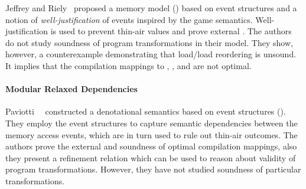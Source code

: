 Jeffrey and Riely~\cite{Jeffrey-Riely:LICS16} proposed 
a memory model (\WJES) based on event structures and a notion of 
\emph{well-justification} of events inspired by the game semantics. 
Well-justification is used to prevent thin-air values 
and prove external \DRF. The authors do not study 
soundness of program transformations in their model. 
They show, however, a counterexample demonstrating that 
load/load reordering is unsound. It implies that 
the compilation mappings to , , and \POWER are not optimal.   

\paragraph{Modular Relaxed Dependencies}

Paviotti~\etal~\cite{Paviotti-al:ESOP20} constructed a 
denotational semantics based on event structures (\MRD). 
They employ the event structures to capture 
semantic dependencies between the memory access events, 
which are in turn used to rule out thin-air outcomes.
The authors prove the external \DRF and 
soundness of optimal compilation mappings,
also they present a refinement relation which 
can be used to reason about validity of program transformations. 
However, they have not studied soundness of particular transformations. 
